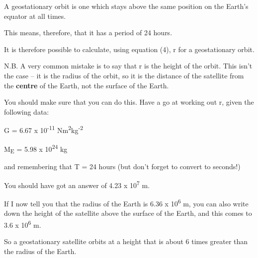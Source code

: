 \documentclass[main.tex]{subfiles}
\begin{document}

A geostationary orbit is one which stays above the same position on the
Earth's equator at all times.

This means, therefore, that it has a period of 24 hours.

It is therefore possible to calculate, using equation (4), r for a
geostationary orbit.

N.B. A very common mistake is to say that r is the height of the orbit.
This isn't the case -- it is the radius of the orbit, so it is the
distance of the satellite from the \textbf{centre} of the Earth, not the
surface of the Earth.

You should make sure that you can do this. Have a go at working out r,
given the following data:

G = 6.67 x 10\textsuperscript{-11}
Nm\textsuperscript{2}kg\textsuperscript{-2}

M\textsubscript{E} = 5.98 x 10\textsuperscript{24} kg

and remembering that T = 24 hours (but don't forget to convert to
seconds!)

You should have got an answer of 4.23 x 10\textsuperscript{7} m.

If I now tell you that the radius of the Earth is
6.36 x 10\textsuperscript{6} m, you can also write down the height of the
satellite above the surface of the Earth, and this comes to
3.6 x 10\textsuperscript{6} m.

So a geostationary satellite orbits at a height that is about 6 times
greater than the radius of the Earth.
\end{document}
